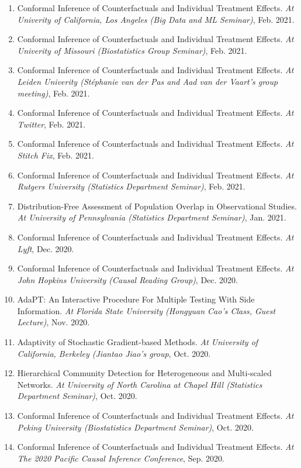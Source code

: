 \documentclass{article}
\begin{document}
\begin{enumerate}
\item Conformal Inference of Counterfactuals and Individual Treatment Effects. \emph{At Univerity of California, Los Angeles (Big Data and ML Seminar)}, Feb. 2021.
\item Conformal Inference of Counterfactuals and Individual Treatment Effects. \emph{At Univerity of Missouri (Biostatistics Group Seminar)}, Feb. 2021.
\item Conformal Inference of Counterfactuals and Individual Treatment Effects. \emph{At Leiden Univerity (Stéphanie van der Pas and Aad van der Vaart's group meeting)}, Feb. 2021.
\item Conformal Inference of Counterfactuals and Individual Treatment Effects. \emph{At Twitter}, Feb. 2021.
\item Conformal Inference of Counterfactuals and Individual Treatment Effects. \emph{At Stitch Fix}, Feb. 2021.
\item Conformal Inference of Counterfactuals and Individual Treatment Effects. \emph{At Rutgers University (Statistics Department Seminar)}, Feb. 2021.
\item Distribution-Free Assessment of Population Overlap in Observational Studies. \emph{At University of Pennsylvania (Statistics Department Seminar)}, Jan. 2021.
\item Conformal Inference of Counterfactuals and Individual Treatment Effects. \emph{At Lyft}, Dec. 2020.
\item Conformal Inference of Counterfactuals and Individual Treatment Effects. \emph{At John Hopkins University (Causal Reading Group)}, Dec. 2020.
\item AdaPT: An Interactive Procedure For Multiple Testing With Side Information. \emph{At Florida State University (Hongyuan Cao's Class, Guest Lecture)}, Nov. 2020. 
\item Adaptivity of Stochastic Gradient-based Methods. \emph{At University of California, Berkeley (Jiantao Jiao's group}, Oct. 2020. 
\item Hierarchical Community Detection for Heterogeneous and Multi-scaled Networks. \emph{At University of North Carolina at Chapel Hill (Statistics Department Seminar)}, Oct. 2020. 
\item Conformal Inference of Counterfactuals and Individual Treatment Effects. \emph{At Peking University (Biostatistics Department Seminar)}, Oct. 2020.
\item Conformal Inference of Counterfactuals and Individual Treatment Effects. \emph{At The 2020 Pacific Causal Inference Conference}, Sep. 2020.

\end{enumerate}
\end{document}
